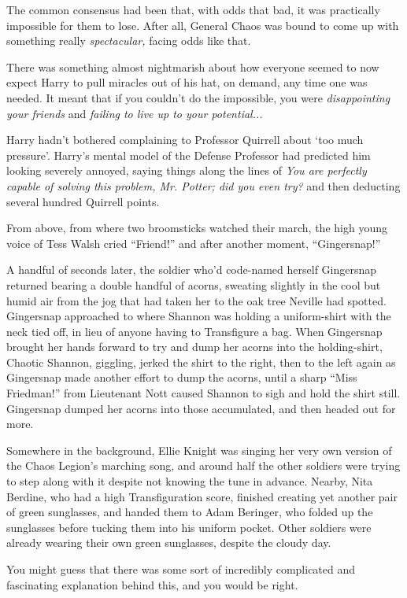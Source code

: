 The common consensus had been that, with odds that bad, it was practically impossible for them to lose. After all, General Chaos was bound to come up with something really \emph{spectacular,} facing odds like that.

There was something almost nightmarish about how everyone seemed to now expect Harry to pull miracles out of his hat, on demand, any time one was needed. It meant that if you couldn't do the impossible, you were \emph{disappointing your friends} and \emph{failing to live up to your potential...}

Harry hadn't bothered complaining to Professor Quirrell about `too much pressure'. Harry's mental model of the Defense Professor had predicted him looking severely annoyed, saying things along the lines of \emph{You are perfectly capable of solving this problem, Mr. Potter; did you even try?} and then deducting several hundred Quirrell points.

From above, from where two broomsticks watched their march, the high young voice of Tess Walsh cried ``Friend!'' and after another moment, ``Gingersnap!''

A handful of seconds later, the soldier who'd code-named herself Gingersnap returned bearing a double handful of acorns, sweating slightly in the cool but humid air from the jog that had taken her to the oak tree Neville had spotted. Gingersnap approached to where Shannon was holding a uniform-shirt with the neck tied off, in lieu of anyone having to Transfigure a bag. When Gingersnap brought her hands forward to try and dump her acorns into the holding-shirt, Chaotic Shannon, giggling, jerked the shirt to the right, then to the left again as Gingersnap made another effort to dump the acorns, until a sharp ``Miss Friedman!'' from Lieutenant Nott caused Shannon to sigh and hold the shirt still. Gingersnap dumped her acorns into those accumulated, and then headed out for more.

Somewhere in the background, Ellie Knight was singing her very own version of the Chaos Legion's marching song, and around half the other soldiers were trying to step along with it despite not knowing the tune in advance. Nearby, Nita Berdine, who had a high Transfiguration score, finished creating yet another pair of green sunglasses, and handed them to Adam Beringer, who folded up the sunglasses before tucking them into his uniform pocket. Other soldiers were already wearing their own green sunglasses, despite the cloudy day.

You might guess that there was some sort of incredibly complicated and fascinating explanation behind this, and you would be right.

